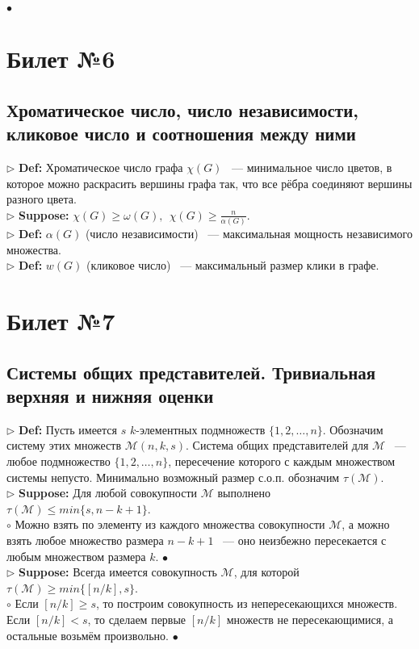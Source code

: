 \documentclass[a4paper]{article}
\begin{document}
$\bullet$ \\ 

\section{Билет №6}
\subsection{Хроматическое число, число независимости, кликовое число и соотношения между ними}
$\triangleright$ \textbf{Def:} Хроматическое число графа $\chi(G)$ ~--- минимальное число цветов, в которое можно раскрасить вершины графа так, что все рёбра соединяют вершины разного цвета.
\\
$\triangleright$ \textbf{Suppose:} $\chi(G)\geq \omega(G),\:\: \chi(G)\geq \frac{n}{\alpha(G)}$.
\\
$\triangleright$ \textbf{Def:} $\alpha(G)$ (число независимости) ~--- максимальная мощность независимого множества.
\\
$\triangleright$ \textbf{Def:} $w(G)$ (кликовое число) ~--- максимальный размер клики в графе.
\\

\section{Билет №7}
\subsection{Системы общих представителей. Тривиальная верхняя и нижняя оценки}
$\triangleright$ \textbf{Def:} Пусть имеется $s$ $k$-элементных подмножеств $\{1,2,\dots,n\}$. Обозначим систему этих множеств $\mathcal{M}(n,k,s)$. Система общих представителей для $\mathcal{M}$ ~--- любое подмножество $\{1,2,\dots,n\}$, пересечение которого с каждым множеством системы непусто. Минимально возможный размер с.о.п. обозначим $\tau(\mathcal{M})$.
\\
$\triangleright$ \textbf{Suppose:} Для любой совокупности $\mathcal{M}$ выполнено $\tau(\mathcal{M})\leq min\{s,n-k+1\}$.
\\
$\circ$  Можно взять по элементу из каждого множества совокупности $\mathcal{M}$, а можно взять любое множество размера $n-k+1$ ~--- оно неизбежно пересекается с любым множеством размера $k$.
$\bullet$ \\ 
$\triangleright$ \textbf{Suppose:} Всегда имеется совокупность $\mathcal{M}$, для которой $\tau(\mathcal{M})\geq min\{[n/k],s\}$.
\\
$\circ$  Если $[n/k]\geq s$, то построим совокупность из непересекающихся множеств. Если $[n/k]<s$, то сделаем первые $[n/k]$ множеств не пересекающимися, а остальные возьмём произвольно.
$\bullet$ \\ 
\end{document}
